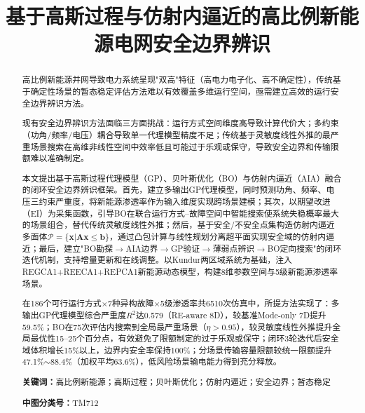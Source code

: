 \documentclass[a4paper,11pt]{ctexart}
\title{基于高斯过程与仿射内逼近的高比例新能源电网安全边界辨识}
\author{}
\date{}
\newcommand{\bx}{\mathbf{x}}
\newcommand{\bA}{\mathbf{A}}
\newcommand{\bb}{\mathbf{b}}
\begin{document}
\maketitle

\begin{abstract}
高比例新能源并网导致电力系统呈现"双高"特征（高电力电子化、高不确定性），传统基于确定性场景的暂态稳定评估方法难以有效覆盖多维运行空间，亟需建立高效的运行安全边界辨识方法。

现有安全边界辨识方法面临三方面挑战：运行方式空间维度高导致计算代价大；多约束（功角/频率/电压）耦合导致单一代理模型精度不足；传统基于灵敏度线性外推的最严重场景搜索在高维非线性空间中效率低且可能过于乐观或保守，导致安全边界和传输限额难以准确制定。

本文提出基于高斯过程代理模型（GP）、贝叶斯优化（BO）与仿射内逼近（AIA）融合的闭环安全边界辨识框架。首先，建立多输出GP代理模型，同时预测功角、频率、电压三约束严重度，将新能源渗透率作为输入维度实现跨场景建模；其次，以期望改进（EI）为采集函数，引导BO在联合运行方式--故障空间中智能搜索使系统失稳概率最大的场景组合，替代传统灵敏度线性外推；然后，基于安全/不安全点集构造仿射内逼近多面体$\mathcal{P}=\{\bx|\bA\bx\leq\bb\}$，通过凸包计算与线性规划分离超平面实现安全域的仿射内逼近；最后，建立"BO勘探$\to$AIA边界$\to$GP验证$\to$薄弱点辨识$\to$BO定向搜索"的闭环迭代机制，支持增量更新和在线调整。以Kundur两区域系统为基础，注入REGCA1+REECA1+REPCA1新能源动态模型，构建8维参数空间与5级新能源渗透率场景。

在186个可行运行方式$\times$7种异构故障$\times$5级渗透率共6510次仿真中，所提方法实现了：多输出GP代理模型综合严重度$R^2$达0.579（RE-aware 8D），较基准Mode-only 7D提升59.5\%；BO在75次评估内搜索到全局最严重场景（$\eta > 0.95$），较灵敏度线性外推提升全局最优性15--25个百分点，有效避免了限额制定的过于乐观或保守；闭环3轮迭代后安全域体积增长15\%以上，边界内安全率保持100\%；分场景传输容量限额较统一限额提升47.1\%$\sim$88.4\%（加权平均63.6\%），低风险场景输电能力得到充分释放。

\medskip
\textbf{关键词：}高比例新能源；高斯过程；贝叶斯优化；仿射内逼近；安全边界；暂态稳定

\medskip
\textbf{中图分类号：}TM712
\end{abstract}
\end{document}
